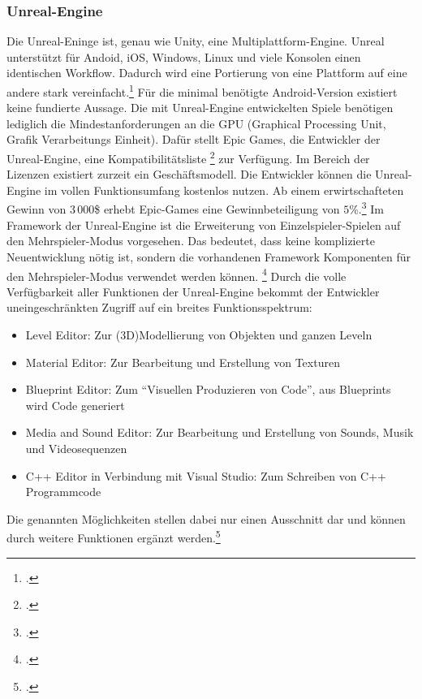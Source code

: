 	\subsubsection*{Unreal-Engine}
	Die Unreal-Eninge ist, genau wie Unity, eine Multiplattform-Engine. Unreal unterstützt für Andoid, iOS, Windows, Linux und viele Konsolen einen identischen Workflow. Dadurch wird eine Portierung von eine Plattform auf eine andere stark vereinfacht.\footcite[\url{https://www.unrealengine.com/what-is-unreal-engine-4}]{unreal-home} Für die minimal benötigte Android-Version existiert keine fundierte Aussage. Die mit Unreal-Engine entwickelten Spiele benötigen lediglich die Mindestanforderungen an die GPU (Graphical Processing Unit, Grafik Verarbeitungs Einheit). Dafür stellt Epic Games, die Entwickler der Unreal-Engine, eine Kompatibilitätsliste \footcite[\url{https://docs.unrealengine.com/latest/INT/Platforms/Android/DeviceCompatibility/index.html}]{unreal-home} zur Verfügung. Im Bereich der Lizenzen existiert zurzeit ein Geschäftsmodell. Die Entwickler können die Unreal-Engine im vollen Funktionsumfang kostenlos nutzen. Ab einem erwirtschafteten Gewinn von $3\, 000$\$ erhebt Epic-Games eine Gewinnbeteiligung von $5$\%.\footcite[\url{https://www.unrealengine.com/custom-licensing}]{unreal-home} Im Framework der Unreal-Engine ist die Erweiterung von Einzelspieler-Spielen auf den Mehrspieler-Modus vorgesehen. Das bedeutet, dass keine komplizierte Neuentwicklung nötig ist, sondern die vorhandenen Framework Komponenten für den Mehrspieler-Modus verwendet werden können. \footcite[\url{https://docs.unrealengine.com/latest/INT/Gameplay/Networking/Overview/index.html}]{unreal-home} Durch die volle Verfügbarkeit aller Funktionen der Unreal-Engine bekommt der Entwickler uneingeschränkten Zugriff auf ein breites Funktionsspektrum:
	\begin{itemize}
		\item{Level Editor: Zur (3D)Modellierung von Objekten und ganzen Leveln}
		\item{Material Editor: Zur Bearbeitung und Erstellung von Texturen}
		\item{Blueprint Editor: Zum \enquote{Visuellen Produzieren von Code}, aus Blueprints wird Code generiert}
		\item{Media and Sound Editor: Zur Bearbeitung und Erstellung von Sounds, Musik und Videosequenzen}
		\item{C++ Editor in Verbindung mit Visual Studio: Zum Schreiben von C++ Programmcode}
	\end{itemize}
	Die genannten Möglichkeiten stellen dabei nur einen Ausschnitt dar und können durch weitere Funktionen ergänzt werden.\footcite[https://docs.unrealengine.com/latest/INT/GettingStarted/SubEditors/]{unreal-home}

